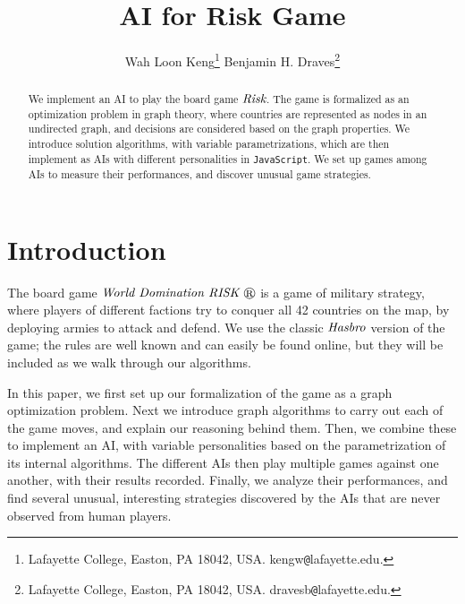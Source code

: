 \documentclass[12pt]{article}  %
\begin{document}
\title{AI for Risk Game}

\author{
{Wah Loon Keng}\thanks{
Lafayette College,
Easton, PA 18042, USA.
kengw{\tt @}lafayette.edu.}
\qquad
{Benjamin H. Draves}\thanks{
Lafayette College,
Easton, PA 18042, USA.
dravesb{\tt @}lafayette.edu.}
}
\maketitle

\begin{abstract}
We implement an AI to play the board game $\emph{Risk}$. The game is formalized as an optimization problem in graph theory, where countries are represented as nodes in an undirected graph, and decisions are considered based on the graph properties. We introduce solution algorithms, with variable parametrizations, which are then implement as AIs with different personalities in {\tt JavaScript}. We set up games among AIs to measure their performances, and discover unusual game strategies.
\end{abstract}










\section{Introduction} \label{intro}

The board game $\emph{World Domination RISK \circledR}$ is a game of military strategy, where players of different factions try to conquer all 42 countries on the map, by deploying armies to attack and defend. We use the classic $\emph{Hasbro}$ version of the game; the rules are well known and can easily be found online, but they will be included as we walk through our algorithms.

In this paper, we first set up our formalization of the game as a graph optimization problem. Next we introduce graph algorithms to carry out each of the game moves, and explain our reasoning behind them. Then, we combine these to implement an AI, with variable personalities based on the parametrization of its internal algorithms. The different AIs then play multiple games against one another, with their results recorded. Finally, we analyze their performances, and find several unusual, interesting strategies discovered by the AIs that are never observed from human players.
\end{document}

